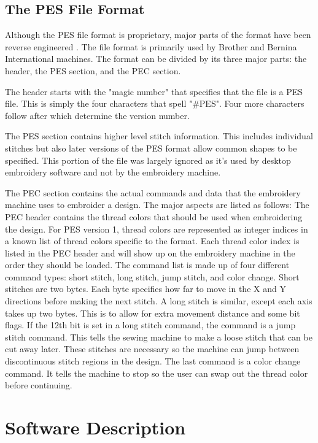 \documentclass{article}
\begin{document}
\subsection{The PES File Format}

Although the PES file format is proprietary, major parts of the format have been reverse engineered \cite{PESFormat}. The file format is primarily used by Brother and Bernina International machines. The format can be divided by its three major parts: the header, the PES section, and the PEC section.

The header starts with the "magic number" that specifies that the file is a PES file. This is simply the four characters that spell "\#PES". Four more characters follow after which determine the version number.

The PES section contains higher level stitch information. This includes individual stitches but also later versions of the PES format allow common shapes to be specified. This portion of the file was largely ignored as it's used by desktop embroidery software and not by the embroidery machine.

The PEC section contains the actual commands and data that the embroidery machine uses to embroider a design. The major aspects are listed as follows: The PEC header contains the thread colors that should be used when embroidering the design. For PES version 1, thread colors are represented as integer indices in a known list of thread colors specific to the format. Each thread color index is listed in the PEC header and will show up on the embroidery machine in the order they should be loaded. The command list is made up of four different command types: short stitch, long stitch, jump stitch, and color change. Short stitches are two bytes. Each byte specifies how far to move in the X and Y directions before making the next stitch. A long stitch is similar, except each axis takes up two bytes. This is to allow for extra movement distance and some bit flags. If the 12th bit is set in a long stitch command, the command is a jump stitch command. This tells the sewing machine to make a loose stitch that can be cut away later. These stitches are necessary so the machine can jump between discontinuous stitch regions in the design. The last command is a color change command. It tells the machine to stop so the user can swap out the thread color before continuing.

\section{Software Description}
\end{document}
